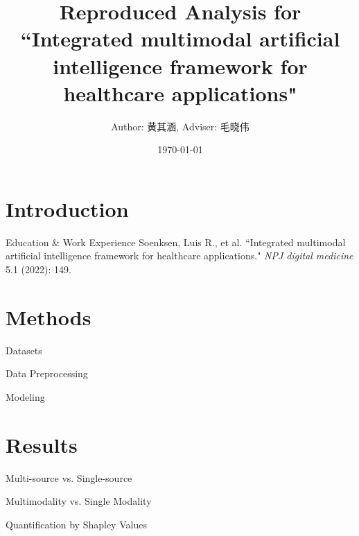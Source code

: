 \documentclass{sintefbeamer}
\title{\large Reproduced Analysis for ``Integrated multimodal artificial intelligence framework for healthcare applications"}
\subtitle{Author: 黄其涵, Adviser: 毛晓伟}
\date{\today}
\theoremstyle{definition}
\begin{document}
\maketitle


\section{Introduction}

\begin{frame}{Education \& Work Experience}
\scriptsize Soenksen, Luis R., et al. ``Integrated multimodal artificial intelligence framework for healthcare applications." \textit{NPJ digital medicine} 5.1 (2022): 149.


\end{frame}


\section{Methods}


\begin{frame}{Datasets}

\end{frame}

\begin{frame}{Data Preprocessing}

\end{frame}

\begin{frame}{Modeling}

\end{frame}



\section{Results}

\begin{frame}{Multi-source vs. Single-source}


\end{frame}

\begin{frame}{Multimodality vs. Single Modality}


\end{frame}

\begin{frame}{ Quantification by Shapley Values}


\end{frame}

\backmatter
\end{document}
